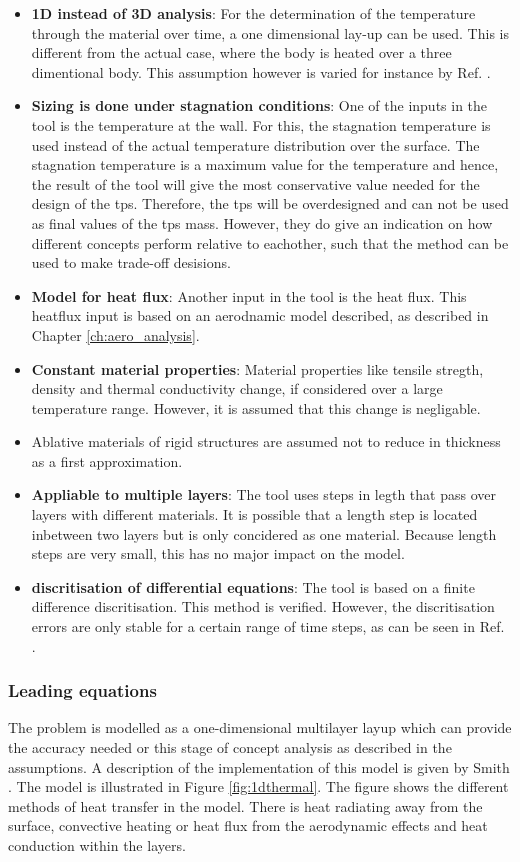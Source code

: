 \begin{itemize}
\item \textbf{1D instead of 3D analysis}: For the determination of the temperature through the material over time, a one dimensional lay-up can be used. This is different from the actual case, where the body is heated over a three dimentional body. This assumption however is varied for instance by Ref. \cite{Corso2009}.
\item \textbf{Sizing is done under stagnation conditions}: One of the inputs in the tool is the temperature at the wall. For this, the stagnation temperature is used instead of the actual temperature distribution over the surface. The stagnation temperature is a maximum value for the temperature and hence, the result of the tool will give the most conservative value needed for the design of the \gls{tps}. Therefore, the \gls{tps} will be overdesigned and can not be used as final values of the \gls{tps} mass. However, they do give an indication on how different concepts perform relative to eachother, such that the method can be used to make trade-off desisions.
\item \textbf{Model for heat flux}: Another input in the tool is the heat flux. This heatflux input is based on an aerodnamic model described, as described in Chapter \ref{ch:aero_analysis}.
\item \textbf{Constant material properties}: Material properties like tensile stregth, density and thermal conductivity change, if considered over a large temperature range. However, it is assumed that this change is negligable. 
\item Ablative materials of rigid structures are assumed not to reduce in thickness as a first approximation.
\item \textbf{Appliable to multiple layers}: The tool uses steps in legth that pass over layers with different materials. It is possible that a length step is located inbetween two layers but is only concidered as one material. Because length steps are very small, this has no major impact on the model.
\item \textbf{discritisation of differential equations}: The tool is based on a finite difference discritisation. This method is verified. However, the discritisation errors are only stable for a certain range of time steps, as can be seen in Ref. \cite{Smith2011}. 
\end{itemize}

\subsubsection{Leading equations}
The problem is modelled as a one-dimensional multilayer layup which can provide the accuracy needed or this stage of concept analysis as described in the assumptions. A description of the implementation of this model is given by Smith \cite{Smith2011}. The model is illustrated in Figure \ref{fig:1dthermal}. The figure shows the different methods of heat transfer in the model. There is heat radiating away from the surface, convective heating or heat flux from the aerodynamic effects and heat conduction within the layers.

